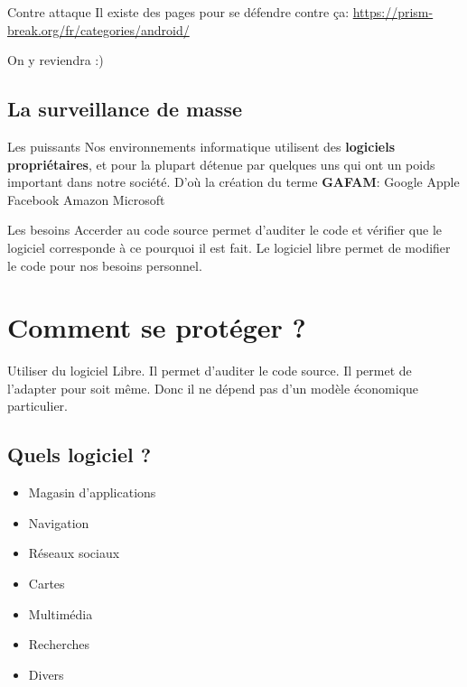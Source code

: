\documentclass[compress]{beamer}
\begin{document}
\begin{frame}{Contre attaque}
Il existe des pages pour se défendre contre ça:
\url{https://prism-break.org/fr/categories/android/}

On y reviendra :)
\end{frame}

\subsection{La surveillance de masse}

\begin{frame}{Les puissants}
Nos environnements informatique utilisent des \textbf{logiciels propriétaires}, et pour la plupart détenue par quelques uns qui ont un poids important dans notre société. \newline
\newline
D'où la création du terme \textbf{GAFAM}: Google Apple Facebook Amazon Microsoft
\end{frame}

\begin{frame}{Les besoins}
Accerder au code source permet d'auditer le code et vérifier que le logiciel corresponde à ce pourquoi il est fait. \newline
\newline
Le logiciel libre permet de modifier le code pour nos besoins personnel.
\end{frame}



\section{Comment se protéger ?}

\begin{frame}
Utiliser du logiciel Libre.\newline
Il permet d'auditer le code source.\newline
Il permet de l'adapter pour soit même.\newline
Donc il ne dépend pas d'un modèle économique particulier.
\end{frame}

\subsection{Quels logiciel ?}
\begin{frame}
\begin{itemize}
	\item Magasin d'applications
	\item Navigation
	\item Réseaux sociaux
	\item Cartes
	\item Multimédia
	\item Recherches
	\item Divers
\end{itemize}
\end{frame}
\end{document}
